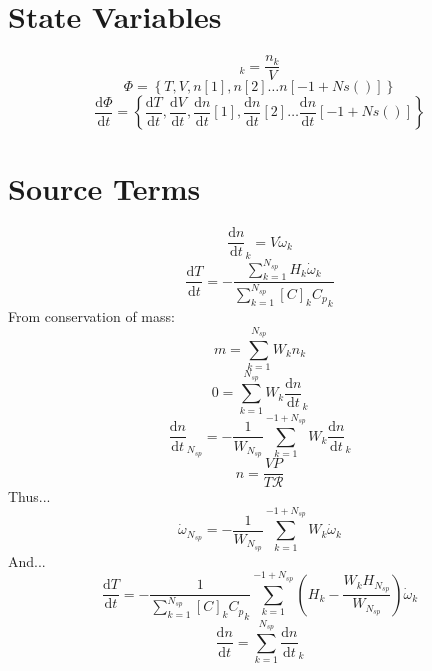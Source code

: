 \documentclass[a4paper,10pt]{article}
\newcommand{\ns}{N_{sp}}
\newcommand{\Ru}{\mathcal{R}}
\begin{document}
\section{State Variables}
\begin{dmath} [C]_{k} = \frac{n_{k}}{V}\end{dmath} 
\begin{dmath} \Phi = \left\{T,V,n[1],n[2]\ldots n[-1 + Ns()]\right\}\end{dmath} 
\begin{dmath} \frac{\text{d} \Phi }{\text{d} t } = \left\{\frac{\text{d} T }{\text{d} t },\frac{\text{d} V }{\text{d} t },\frac{\text{d} n }{\text{d} t }[1],\frac{\text{d} n }{\text{d} t }[2]\ldots \frac{\text{d} n }{\text{d} t }[-1 + Ns()]\right\}\end{dmath} 
\section{Source Terms}
\begin{dmath} \frac{\text{d} n }{\text{d} t }_{k} = V \dot{\omega}_{k}\end{dmath} 
\begin{dmath} \frac{\text{d} T }{\text{d} t } = - \frac{\sum_{k=1}^{\ns} H_{k} \dot{\omega}_{k}}{\sum_{k=1}^{\ns} [C]_{k} {C_p}_{k}}\end{dmath} 
From conservation of mass:
\begin{dmath} m = \sum_{k=1}^{\ns} W_{k} n_{k}\end{dmath} 
\begin{dmath} 0 = \sum_{k=1}^{\ns} W_{k} \frac{\text{d} n }{\text{d} t }_{k}\end{dmath} 
\begin{dmath} \frac{\text{d} n }{\text{d} t }_{\ns} = - \frac{1}{W_{\ns}} \sum_{k=1}^{-1 + \ns} W_{k} \frac{\text{d} n }{\text{d} t }_{k}\end{dmath} 
\begin{dmath} n = \frac{V P}{T \Ru}\end{dmath} 
Thus...\begin{dmath} \dot{\omega}_{\ns} = - \frac{1}{W_{\ns}} \sum_{k=1}^{-1 + \ns} W_{k} \dot{\omega}_{k}\end{dmath} 
And...\begin{dmath} \frac{\text{d} T }{\text{d} t } = - \frac{1}{\sum_{k=1}^{\ns} [C]_{k} {C_p}_{k}} \sum_{k=1}^{-1 + \ns} \left(H_{k} - \frac{W_{k} H_{\ns}}{W_{\ns}}\right) \dot{\omega}_{k}\end{dmath} 
\begin{dmath} \frac{\text{d} n }{\text{d} t } = \sum_{k=1}^{\ns} \frac{\text{d} n }{\text{d} t }_{k}\end{dmath} 
\end{document}
